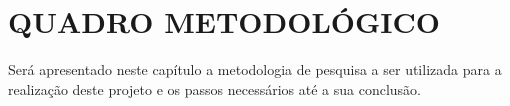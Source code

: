 
\chapter{QUADRO METODOLÓGICO}
\label{cap:quadroMetodologico}


\par Será apresentado neste capítulo a metodologia de pesquisa a ser utilizada para a realização deste projeto e os passos necessários até a sua conclusão.

















